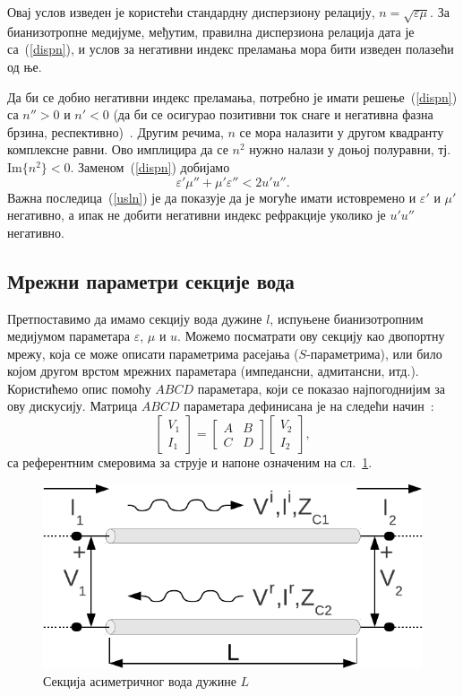 \documentclass[main.tex]{subfiles}
\begin{document}
Овај услов изведен је користећи стандардну дисперзиону релацију, $n=\sqrt{\varepsilon\mu}$. За бианизотропне медијуме, међутим, правилна дисперзиона релација дата је са~(\ref{dispn}), и услов за негативни индекс преламања мора бити изведен полазећи од ње.

Да би се добио негативни индекс преламања, потребно је имати решење~(\ref{dispn}) са $n''>0$ и $n'<0$ (да би се осигурао позитивни ток снаге и негативна фазна брзина, респективно)~\cite{mccall}. Другим речима, $n$ се мора налазити у другом квадранту комплексне равни. Ово имплицира да се $n^2$ нужно налази у доњој полуравни, тј. $\mathrm{Im}\{n^2\}<0$. Заменом~(\ref{dispn}) добијамо
\begin{equation}\label{usln}
\varepsilon'\mu''+\mu'\varepsilon'' < 2u'u''.
\end{equation}
Важна последица~(\ref{usln}) је да показује да је могуће имати истовремено и $\varepsilon'$ и $\mu'$ негативно, а ипак не добити негативни индекс рефракције уколико је $u'u''$ негативно.

\subsection{Мрежни параметри секције вода}
Претпоставимо да имамо секцију вода дужине $l$, испуњене бианизотропним медијумом параметара $\varepsilon$, $\mu$ и $u$. Можемо посматрати ову секцију као двопортну мрежу, која се може описати параметрима расејања ($S$-параметрима), или било којом другом врстом мрежних параметара (импедансни, адмитансни, итд.). Користићемо опис помоћу $ABCD$ параметара, који се показао најпогоднијим за ову дискусију. Матрица $ABCD$ параметара дефинисана је на следећи начин~\cite{Pozar:05}:
\begin{equation}\label{abcd_osn}
\begin{bmatrix} V_1 \\ I_1 \end{bmatrix} = 
\begin{bmatrix} A & B \\ C & D \end{bmatrix}
\begin{bmatrix} V_2 \\ I_2 \end{bmatrix},
\end{equation}
са референтним смеровима за струје и напоне означеним на сл.~\ref{fpole}.
\begin{figure}[!t]
\centering
\includegraphics[width=0.5\columnwidth]{slike/sekcija.pdf}
\caption{Секција асиметричног вода дужине $L$}
\label{fpole}
\end{figure}
\end{document}

